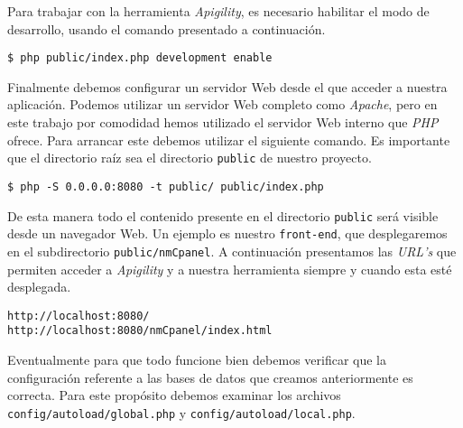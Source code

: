 	Para trabajar con la herramienta \emph{Apigility}, es necesario habilitar el modo de desarrollo, usando el comando presentado a continuación. 
	\begin{lstlisting}[style=myBash]
$ php public/index.php development enable
	\end{lstlisting}
	Finalmente debemos configurar un servidor Web desde el que acceder a nuestra aplicación. Podemos utilizar un servidor Web completo como
	\emph{Apache}\cite{Apache}, pero en este trabajo por comodidad hemos utilizado el servidor Web interno que \emph{PHP} ofrece. Para arrancar este debemos
	utilizar el siguiente comando. Es importante que  el directorio raíz sea el directorio \texttt{public} de nuestro proyecto.
	\begin{lstlisting}[style=myBash]
$ php -S 0.0.0.0:8080 -t public/ public/index.php
	\end{lstlisting}
	De esta manera todo el contenido presente en el directorio \texttt{public} será visible desde un navegador Web. Un ejemplo es nuestro
	\texttt{front-end}, que desplegaremos en el subdirectorio \texttt{public/nmCpanel}. A continuación presentamos las \emph{URL's} que permiten
	acceder a \emph{Apigility} y a nuestra herramienta siempre y cuando esta esté desplegada.
	\begin{lstlisting}[style=myFile]
http://localhost:8080/
http://localhost:8080/nmCpanel/index.html
	\end{lstlisting}
	Eventualmente para que todo funcione bien debemos verificar que la configuración referente a las bases de datos que creamos anteriormente es
	correcta. Para este propósito debemos examinar los archivos \texttt{config/autoload/global.php} y \texttt{config/autoload/local.php}.

